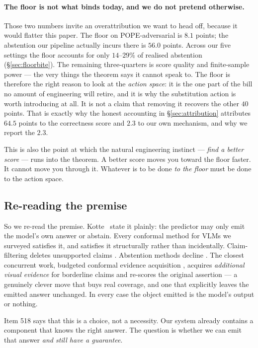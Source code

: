 \documentclass[review,number,doubleblind]{elsarticle}
\theoremstyle{plain}
\theoremstyle{definition}
\theoremstyle{remark}
\begin{document}
\paragraph{The floor is not what binds today, and we do not pretend otherwise.}
Those two numbers invite an overattribution we want to head off, because it would flatter
this paper. The floor on POPE-adversarial is $8.1$ points; the abstention our pipeline
actually incurs there is $56.0$ points. Across our five settings the floor accounts for only
$14$--$29\%$ of realised abstention (\S\ref{sec:floorbite}). The remaining three-quarters is
score quality and finite-sample power --- the very things the theorem says it cannot speak
to. The floor is therefore the right reason to look at the \emph{action space}: it is the one
part of the bill no amount of engineering will retire, and it is why the substitution action
is worth introducing at all. It is not a claim that removing it recovers the other
$40$ points. That is exactly why the honest accounting in \S\ref{sec:attribution} attributes
$64.5$ points to the correctness score and $2.3$ to our own mechanism, and why we report the
$2.3$.

This is also the point at which the natural engineering instinct --- \emph{find a better
score} --- runs into the theorem. A better score moves you toward the floor faster. It cannot
move you through it. Whatever is to be done \emph{to the floor} must be done to the action
space.

\subsection{Re-reading the premise}

So we re-read the premise. Kotte~\cite{crcimposs} state it plainly: the predictor may only emit
the model's own answer or abstain. Every conformal method for VLMs we surveyed satisfies
it, and satisfies it structurally rather than incidentally. Claim-filtering deletes
unsupported claims \citep{conflvlm,conformalfactuality}. Abstention methods decline
\citep{onlineabstention,twoaxes}. The closest concurrent work, budgeted conformal evidence
acquisition \citep{bcea}, acquires \emph{additional visual evidence} for borderline claims
and re-scores the original assertion --- a genuinely clever move that buys real coverage,
and one that explicitly leaves the emitted answer unchanged. In every case the object
emitted is the model's output or nothing.

Item 518 says that this is a choice, not a necessity. Our system already contains a
component that knows the right answer. The question is whether we can emit that answer
\emph{and still have a guarantee}.
\end{document}
